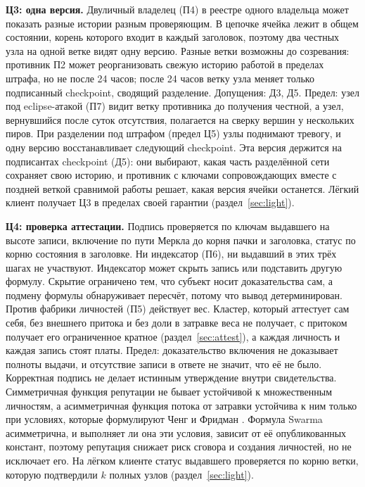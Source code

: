 \documentclass[10pt,a4paper]{article}
\begin{document}
\textbf{Ц3: одна версия.}
Двуличный владелец (П4) в реестре одного владельца может показать разные истории разным проверяющим.
В цепочке ячейка лежит в общем состоянии, корень которого входит в каждый заголовок, поэтому два честных узла на одной ветке видят одну версию.
Разные ветки возможны до созревания: противник П2 может реорганизовать свежую историю работой в пределах штрафа, но не после 24 часов; после 24 часов ветку узла меняет только подписанный checkpoint, сводящий разделение.
Допущения: Д3, Д5.
Предел: узел под eclipse-атакой (П7) видит ветку противника до получения честной, а узел, вернувшийся после суток отсутствия, полагается на сверку вершин у нескольких пиров.
При разделении под штрафом (предел Ц5) узлы поднимают тревогу, и одну версию восстанавливает следующий checkpoint.
Эта версия держится на подписантах checkpoint (Д5): они выбирают, какая часть разделённой сети сохраняет свою историю, и противник с ключами сопровождающих вместе с поздней веткой сравнимой работы решает, какая версия ячейки останется.
Лёгкий клиент получает Ц3 в пределах своей гарантии (раздел~\ref{sec:light}).

\textbf{Ц4: проверка аттестации.}
Подпись проверяется по ключам выдавшего на высоте записи, включение по пути Меркла до корня пачки и заголовка, статус по корню состояния в заголовке.
Ни индексатор (П6), ни выдавший в этих трёх шагах не участвуют.
Индексатор может скрыть запись или подставить другую формулу.
Скрытие ограничено тем, что субъект носит доказательства сам, а подмену формулы обнаруживает пересчёт, потому что вывод детерминирован.
Против фабрики личностей (П5) действует вес.
Кластер, который аттестует сам себя, без внешнего притока и без доли в затравке веса не получает, с притоком получает его ограниченное кратное (раздел~\ref{sec:attest}), а каждая личность и каждая запись стоят платы.
Предел: доказательство включения не доказывает полноты выдачи, и отсутствие записи в ответе не значит, что её не было.
Корректная подпись не делает истинным утверждение внутри свидетельства.
Симметричная функция репутации не бывает устойчивой к множественным личностям, а асимметричная функция потока от затравки устойчива к ним только при условиях, которые формулируют Ченг и Фридман \cite{sybilproof}.
Формула Swarma асимметрична, и выполняет ли она эти условия, зависит от её опубликованных констант, поэтому репутация снижает риск сговора и создания личностей, но не исключает его.
На лёгком клиенте статус выдавшего проверяется по корню ветки, которую подтвердили $k$ полных узлов (раздел~\ref{sec:light}).
\end{document}

